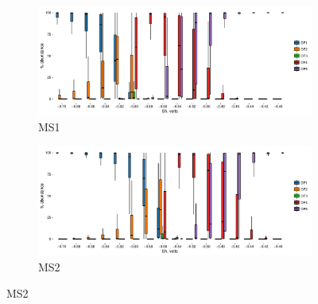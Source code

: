 \begin{figure}[h]
\centering

    \begin{subfigure}[b]{\linewidth}
       	\includegraphics[width=1\linewidth]{"figs_app2/boxplot_ggplot_02bin Mound OF1 iter 999"}
       	\caption{MS1}
        \label{fig:MS1_mc}
    \end{subfigure}
    \begin{subfigure}[b]{\linewidth}
    	\includegraphics[width=1\linewidth]{"figs_app2/boxplot_ggplot_02bin Mound OF2 iter 999"}
    	\caption{MS2}
        \label{fig:MS2_mc}
    \end{subfigure}
    
\end{figure}

\newpage

